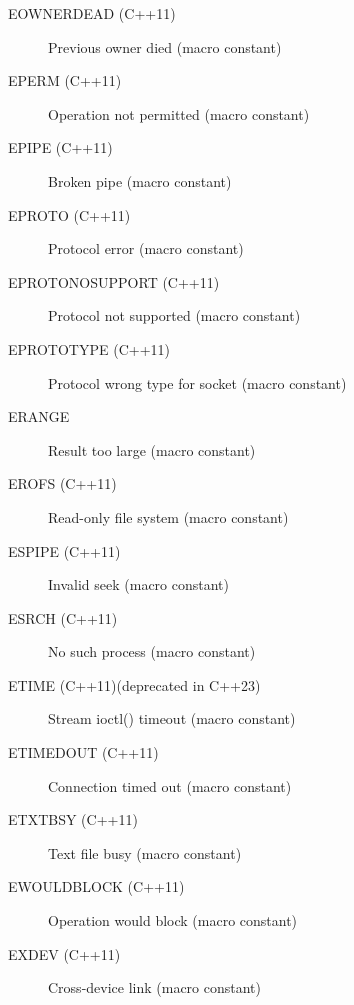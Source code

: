 \documentclass{report}
\begin{document}
\begin{itemize}
\begin{description}
      \item[EOWNERDEAD (C++11)] Previous owner died (macro constant)
      \item[EPERM (C++11)] Operation not permitted (macro constant)
      \item[EPIPE (C++11)] Broken pipe (macro constant)
      \item[EPROTO (C++11)] Protocol error (macro constant)
      \item[EPROTONOSUPPORT (C++11)] Protocol not supported (macro constant)
      \item[EPROTOTYPE (C++11)] Protocol wrong type for socket (macro constant)
      \item[ERANGE] Result too large (macro constant)
      \item[EROFS (C++11)] Read-only file system (macro constant)
      \item[ESPIPE (C++11)] Invalid seek (macro constant)
      \item[ESRCH (C++11)] No such process (macro constant)
      \item[ETIME (C++11)(deprecated in C++23)] Stream ioctl() timeout (macro constant)
      \item[ETIMEDOUT (C++11)] Connection timed out (macro constant)
      \item[ETXTBSY (C++11)] Text file busy (macro constant)
      \item[EWOULDBLOCK (C++11)] Operation would block (macro constant)
      \item[EXDEV (C++11)] Cross-device link (macro constant)
    \end{description}

    \end{itemize}

    \bigbreak \noindent 
\end{document}

